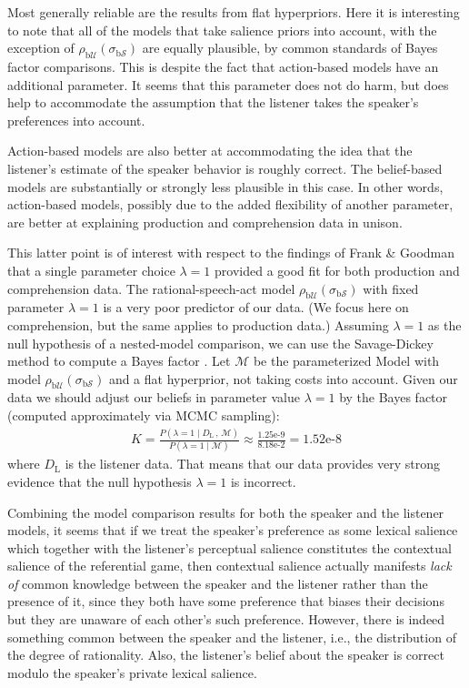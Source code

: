 Most generally reliable are the results from flat hyperpriors. Here it
is interesting to note that all of the models that take salience
priors into account, with the exception of
$\rho_{\mathrm{b}\mathcal{U}}(\sigma_{\mathrm{b}\mathcal{S}})$ are
equally plausible, by common standards of Bayes factor
comparisons. This is despite the fact that action-based models have an
additional parameter. It seems that this parameter does not do harm,
but does help to accommodate the assumption that the listener takes
the speaker's preferences into account. 

Action-based models are also better at accommodating the idea that the
listener's estimate of the speaker behavior is roughly correct. The
belief-based models are substantially or strongly less plausible in
this case. In other words, action-based models, possibly due to the
added flexibility of another parameter, are better at explaining
production and comprehension data in unison.

This latter point is of interest with respect to the findings of Frank
\& Goodman that a single parameter choice $\lambda=1$ provided a good
fit for both production and comprehension data. The
rational-speech-act model
$\rho_{\mathrm{b}\mathcal{U}}(\sigma_{\mathrm{b}\mathcal{S}})$ with
fixed parameter $\lambda=1$ is a very poor predictor of our data. (We
focus here on comprehension, but the same applies to production data.)
Assuming $\lambda =1$ as the null hypothesis of a nested-model
comparison, we can use the Savage-Dickey method to compute a Bayes
factor
\cite{DickeyLientz1970:The-Weighted-Li,WagenmakersLodewyckx2010:Bayesian-hypoth}. Let
$\mathcal{M}$ be the parameterized Model with model
$\rho_{\mathrm{b}\mathcal{U}}(\sigma_{\mathrm{b}\mathcal{S}})$ and a
flat hyperprior, not taking costs into account. Given our data we
should adjust our beliefs in parameter value $\lambda=1$ by the Bayes
factor (computed approximately via MCMC sampling):
\begin{align*}
  K = \frac{P(\lambda=1 \mid D_\mathrm{L} \, , \, \mathcal{M})}{P(\lambda=1
    \mid \mathcal{M})} \approx \frac{1.25\text{e-9}}{8.18\text{e-2}} =
  1.52\text{e-8} 
\end{align*}
where $D_\mathrm{L}$ is the listener data. That means that our data
provides very strong evidence that the null hypothesis $\lambda=1$ is
incorrect.

\bigskip

Combining the model comparison results for both the speaker and the
listener models, it seems that if we treat the speaker's preference as
some lexical salience which together with the listener's perceptual
salience constitutes the contextual salience of the referential game,
then contextual salience actually manifests \emph{lack of} common
knowledge between the speaker and the listener rather than the
presence of it, since they both have some preference that biases their
decisions but they are unaware of each other's such
preference. However, there is indeed something common between the
speaker and the listener, i.e., the distribution of the degree of
rationality. Also, the listener's belief about the speaker is correct
modulo the speaker's private lexical salience.


